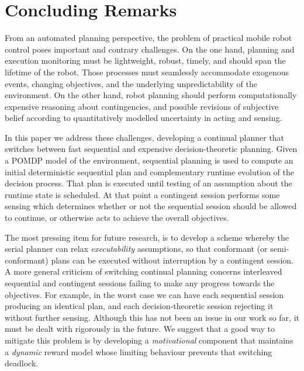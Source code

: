 \documentclass{article}
\begin{document}
\section{Concluding Remarks}

From an automated planning perspective, the problem of practical
mobile robot control poses important and contrary challenges.
On the one hand, planning and execution monitoring must be
lightweight, robust, timely, and should span the lifetime of the
robot. Those processes must seamlessly accommodate exogenous events,
changing objectives, and the underlying unpredictability of the
environment.
On the other hand, robot planning should perform computationally
expensive reasoning about contingencies, and possible revisions of
subjective belief according to quantitatively modelled uncertainty in
acting and sensing. 

In this paper we address these challenges, developing a continual
planner that switches between fast sequential and expensive
decision-theoretic planning. Given a POMDP model of the environment,
sequential planning is used to compute an initial deterministic
sequential plan and complementary runtime evolution of the decision
process. That plan is executed until testing of an assumption about
the runtime state is scheduled. At that point a contingent session
performs some sensing which determines whether or not the sequential
session should be allowed to continue, or otherwise acts to achieve
the overall objectives.


The most pressing item for future research, is to develop a scheme
whereby the serial planner can relax {\em executability} assumptions,
so that conformant (or semi-conformant) plans can be executed without
interruption by a contingent session. A more general criticism of
switching continual planning concerns interleaved sequential and
contingent sessions failing to make any progress towards the
objectives. For example, in the worst case we can have each sequential
session producing an identical plan, and each decision-theoretic
session rejecting it without further sensing. Although this has not
been an issue in our work so far, it must be dealt with rigorously
in the future. We suggest that a good way to mitigate this problem is
by developing a {\em motivational} component that maintains a {\em
dynamic} reward model whose limiting behaviour prevents that switching
deadlock.





\end{document}
